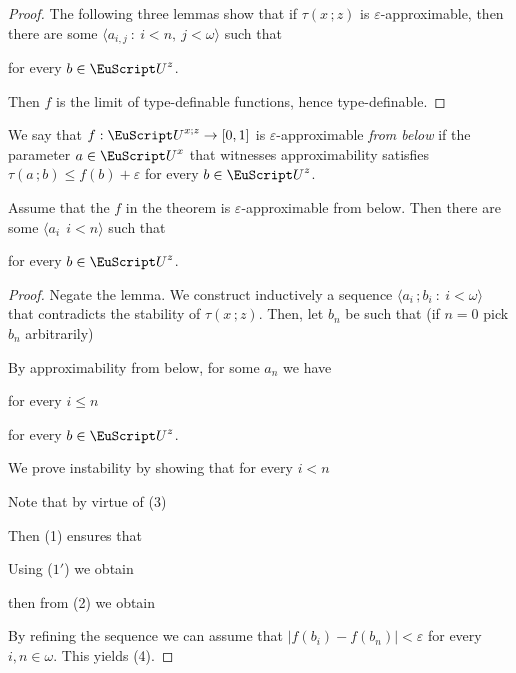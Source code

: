 \begin{proof}
  The following three lemmas show that if $\tau(x\,;z)$ is $\varepsilon$-approximable, then there are some $\langle a_{i,j}\ :\ i<n,\ j<\omega\rangle$ such that\medskip

  \hfill for every $b\in{\EuScript U}^z$.

  Then $f$ is the limit of type-definable functions, hence type-definable.
\end{proof}

We say that $f:{\EuScript U}^{x;z}\to[0,1]$ is $\varepsilon$-approximable \emph{from below\/} if the parameter $a\in{\EuScript U}^x$ that witnesses approximability satisfies $\tau(a\,;b)\le f(b)+\varepsilon$ for every $b\in {\EuScript U}^z$.

\begin{lemma}
  Assume that the $f$ in the theorem is $\varepsilon$-approximable from below.
  Then there are some $\langle a_i\:\ i< n\rangle$ such that\smallskip

  \hfill for every $b\in{\EuScript U}^z$.
\end{lemma}

\begin{proof}
  Negate the lemma.
  We construct inductively a sequence $\langle a_i\,;b_i\ :\ i<\omega\rangle$ that contradicts the stability of $\tau(x\,;z)$.
  Then, let $b_n$ be such that (if $n=0$ pick $b_n$ arbitrarily)


  By approximability from below, for some $a_n$ we have

  \hfill for every $i\le n$

  \hfill for every $b\in{\EuScript U}^{z}$.

  We prove instability by showing that for every $i<n$


  Note that by virtue of (3) 


  Then (1) ensures that


  Using ($1'$) we obtain


  then from (2) we obtain


  By refining the sequence we can assume that $|f(b_i)-f(b_n)|<\varepsilon$ for every $i,n\in\omega$.
  This yields (4).
\end{proof}

